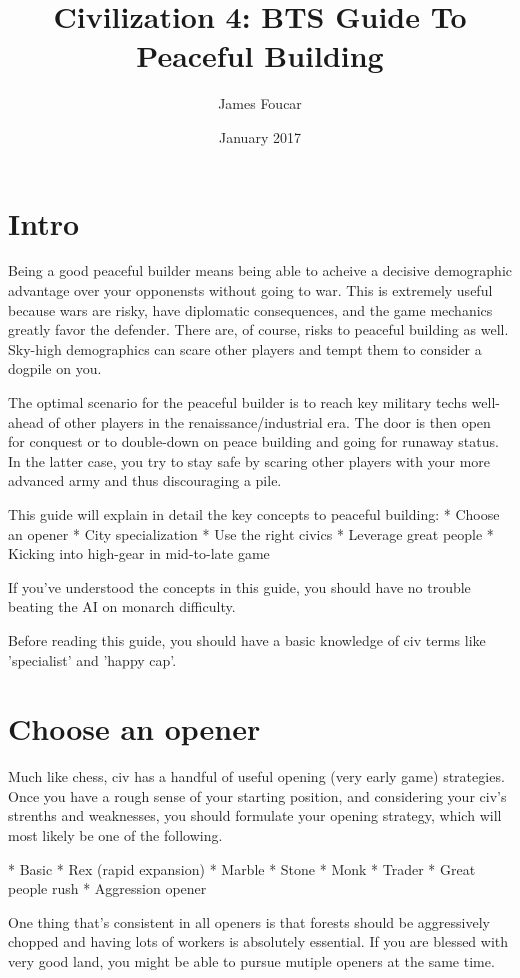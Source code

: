 \documentclass[10pt]{article}
\title{Civilization 4: BTS Guide To Peaceful Building}
\author{James Foucar}
\date{January 2017}
\begin{document}
\section*{Intro}

Being a good peaceful builder means being able to acheive a decisive demographic advantage
over your opponensts without going to war. This is extremely useful because wars are risky, have
diplomatic consequences, and the game mechanics greatly favor the defender. There are, of course,
risks to peaceful building as well. Sky-high demographics can scare other players and tempt them
to consider a dogpile on you.

The optimal scenario for the peaceful builder is to reach key military
techs well-ahead of other players in the renaissance/industrial era. The door is then open for conquest
or to double-down on peace building and going for runaway status. In the latter case, you try to stay
safe by scaring other players with your more advanced army and thus discouraging a pile.

This guide will explain in detail the key concepts to peaceful building:
* Choose an opener
* City specialization
* Use the right civics
* Leverage great people
* Kicking into high-gear in mid-to-late game

If you've understood the concepts in this guide, you should have no trouble beating the AI
on monarch difficulty.

Before reading this guide, you should have a basic knowledge of civ terms like 'specialist'
and 'happy cap'.

\section*{Choose an opener}

Much like chess, civ has a handful of useful opening (very early game) strategies. Once you
have a rough sense of your starting position, and considering your civ's strenths and weaknesses,
you should formulate your opening strategy, which will most likely be one of the following.

* Basic
* Rex (rapid expansion)
* Marble
* Stone
* Monk
* Trader
* Great people rush
* Aggression opener

One thing that's consistent in all openers is that forests should be aggressively chopped and
having lots of workers is absolutely essential. If you are blessed with very good land, you
might be able to pursue mutiple openers at the same time.
\end{document}
